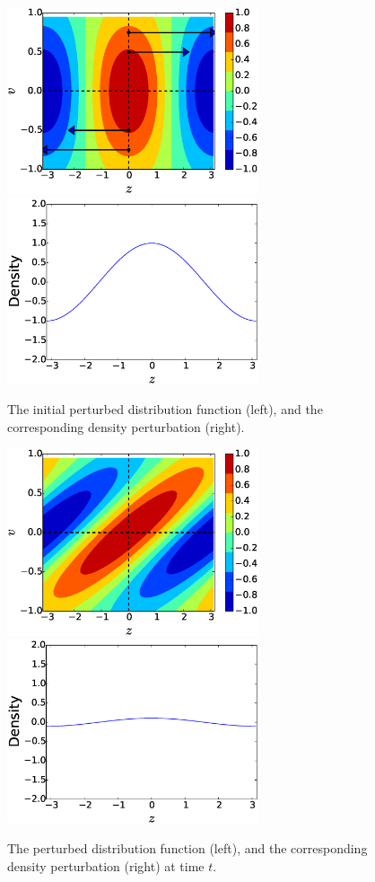      \begin{figure}
     \begin{center}
        \includegraphics[width=7.4cm]{figs/intro/phmixt0.eps}
        \includegraphics[width=7.4cm]{figs/intro/denst0.eps}
        \caption{The initial perturbed distribution function (left), and the corresponding density
        perturbation (right). }
        \label{intro:fig:t0}
     \end{center}
     \end{figure}

     \begin{figure}
     \begin{center}
        \includegraphics[width=7.4cm]{figs/intro/phmixt4.eps}
        \includegraphics[width=7.4cm]{figs/intro/denst4.eps}
        \caption{The perturbed distribution function (left), and the corresponding density
        perturbation (right) at time $t$.}
        \label{intro:fig:tt}
     \end{center}
     \end{figure}

